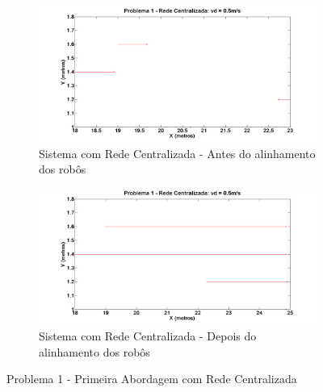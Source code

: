 \begin{figure}[!htb]
	\centering
	\begin{subfigure}{.5\textwidth}
		\centering
		\includegraphics[width=.9\linewidth]{./04-figuras/Simulacoes/Problema1-Abordagem1/P1_A1_Centr_Inicio}
		\caption{Sistema com Rede Centralizada - Antes do alinhamento dos robôs}
		\label{fig:P1CIni}
	\end{subfigure}%
	\begin{subfigure}{.5\textwidth}
		\centering
		\includegraphics[width=.9\linewidth]{./04-figuras/Simulacoes/Problema1-Abordagem1/P1_A1_Centr_Fim}
		\caption{Sistema com Rede Centralizada - Depois do alinhamento dos robôs}
		\label{fig:P1CFim}
	\end{subfigure}
	\caption{Problema 1 - Primeira Abordagem com Rede Centralizada}
	\label{fig:sP1Cent}
\end{figure}


